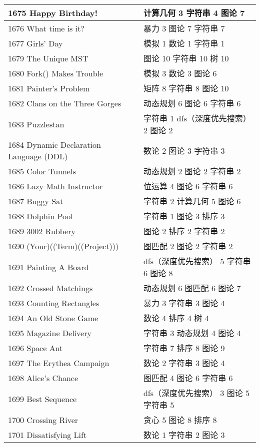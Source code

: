 \begin{longtable}{| p{} | p{} |}
 1675 Happy Birthday!  & 计算几何 3 字符串 4 图论 7 \\ \hline
 1676 What time is it?  & 暴力 3 图论 7 字符串 7 \\ \hline
 1677 Girls' Day  & 模拟 1 数论 1 字符串 1 \\ \hline
 1679 The Unique MST  & 图论 10 字符串 10 树 10 \\ \hline
 1680 Fork() Makes Trouble  & 模拟 3 数论 3 图论 6 \\ \hline
 1681 Painter's Problem  & 矩阵 8 字符串 8 图论 10 \\ \hline
 1682 Clans on the Three Gorges  & 动态规划 6 图论 6 字符串 6 \\ \hline
 1683 Puzzlestan  & 字符串 1 dfs（深度优先搜索） 2 图论 2 \\ \hline
 1684 Dynamic Declaration Language (DDL)  & 数论 2 图论 3 字符串 3 \\ \hline
 1685 Color Tunnels  & 动态规划 2 图论 2 字符串 2 \\ \hline
 1686 Lazy Math Instructor  & 位运算 4 图论 6 字符串 6 \\ \hline
 1687 Buggy Sat  & 字符串 2 计算几何 5 图论 6 \\ \hline
 1688 Dolphin Pool  & 字符串 1 图论 3 排序 3 \\ \hline
 1689 3002 Rubbery  & 图论 2 排序 2 字符串 2 \\ \hline
 1690 (Your)((Term)((Project)))  & 图匹配 2 图论 2 字符串 2 \\ \hline
 1691 Painting A Board  & dfs（深度优先搜索） 5 字符串 6 图论 8 \\ \hline
 1692 Crossed Matchings  & 动态规划 6 图匹配 6 图论 7 \\ \hline
 1693 Counting Rectangles  & 暴力 3 字符串 3 图论 4 \\ \hline
 1694 An Old Stone Game  & 数论 4 排序 4 树 4 \\ \hline
 1695 Magazine Delivery  & 字符串 3 动态规划 4 图论 4 \\ \hline
 1696 Space Ant  & 字符串 7 排序 8 图论 9 \\ \hline
 1697 The Erythea Campaign  & 数论 2 字符串 3 图论 4 \\ \hline
 1698 Alice's Chance  & 图匹配 4 图论 6 字符串 6 \\ \hline
 1699 Best Sequence  & dfs（深度优先搜索） 3 图论 5 字符串 5 \\ \hline
 1700 Crossing River  & 贪心 5 图论 8 排序 8 \\ \hline
 1701 Dissatisfying Lift  & 数论 1 字符串 2 图论 3 \\ \hline

\end{longtable}
